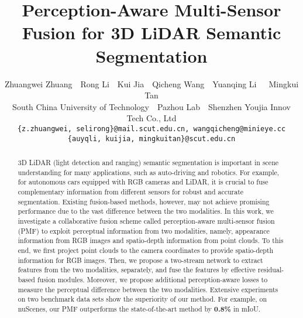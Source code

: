 \documentclass[10pt,twocolumn,letterpaper]{article}
\begin{document}
\title{Perception-Aware Multi-Sensor Fusion for 3D LiDAR Semantic Segmentation}

\author{Zhuangwei Zhuang~~Rong Li~~Kui Jia~~Qicheng Wang~~Yuanqing Li\footnotemark[2]~~~Mingkui Tan\footnotemark[2]\\
South China University of Technology~~Pazhou Lab~~Shenzhen Youjia Innov Tech Co., Ltd\\
{\tt\small \{z.zhuangwei, selirong\}@mail.scut.edu.cn, wangqicheng@minieye.cc} \\ {\tt\small \{auyqli, kuijia, mingkuitan\}@scut.edu.cn}
}

\maketitle
\ificcvfinal\thispagestyle{empty}\fi

\renewcommand{\thefootnote}{\fnsymbol{footnote}}
\renewcommand{\thefootnote}{\arabic{footnote}}

\begin{abstract}
    3D LiDAR (light detection and ranging) semantic segmentation is important in scene understanding for many applications, such as auto-driving and robotics. For example, for autonomous cars equipped with RGB cameras and LiDAR, it is crucial to fuse complementary information from different sensors for robust and accurate segmentation. Existing fusion-based methods, however, may not achieve promising performance due to the vast difference between the two modalities. In this work, we investigate a collaborative fusion scheme called perception-aware multi-sensor fusion (PMF) to exploit perceptual information from two modalities, namely, appearance information from RGB images and spatio-depth information from point clouds. To this end, we first project point clouds to the camera coordinates to provide spatio-depth information for RGB images. Then, we propose a two-stream network to extract features from the two modalities, separately, and fuse the features by effective residual-based fusion modules. Moreover, we propose additional perception-aware losses to measure the perceptual difference between the two modalities. Extensive experiments on two benchmark data sets show the superiority of our method. For example, on nuScenes, our PMF outperforms the state-of-the-art method by \textbf{0.8\%} in mIoU.
    












\end{abstract}
\end{document}

